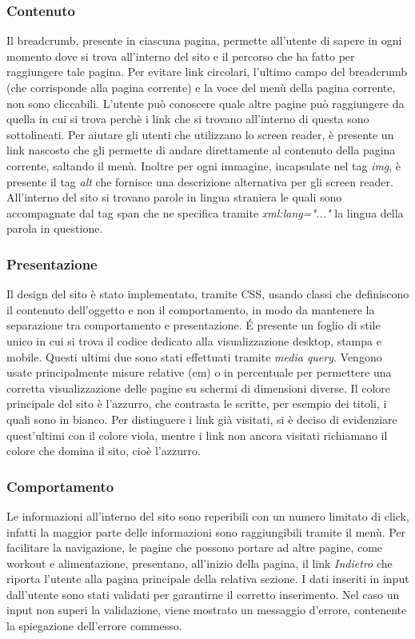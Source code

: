 \subsubsection{Contenuto}
Il breadcrumb, presente in ciascuna pagina, permette all'utente di sapere in ogni momento dove si trova all'interno del sito e il percorso che ha fatto per raggiungere tale pagina. Per evitare link circolari, l'ultimo campo del breadcrumb (che corrisponde alla pagina corrente) e la voce del menù della pagina corrente, non sono cliccabili. L'utente può conoscere quale altre pagine può raggiungere da quella in cui si trova perchè i link che si trovano all'interno di questa sono sottolineati. 
Per aiutare gli utenti che utilizzano lo screen reader, è presente un link nascosto che gli permette di andare direttamente al contenuto della pagina corrente, saltando il menù. Inoltre per ogni immagine, incapsulate nel tag \textit{img}, è presente il tag \textit{alt}  che fornisce una  descrizione alternativa per gli screen reader. 
All'interno del sito si trovano parole in lingua straniera le quali sono accompagnate dal tag span che ne specifica tramite \textit{xml:lang="..."} la lingua della parola in questione. 


\subsubsection{Presentazione}
Il design del sito è stato implementato, tramite CSS, usando classi che definiscono il contenuto
dell’oggetto e non il comportamento, in modo da mantenere la separazione tra comportamento e presentazione. É presente un foglio di stile unico in cui si trova il codice dedicato alla visualizzazione desktop, stampa e mobile. Questi ultimi due sono stati effettuati tramite \textit{media query}. Vengono usate principalmente misure relative (em) o in percentuale per permettere una corretta visualizzazione delle pagine su schermi di dimensioni diverse. 
Il colore principale del sito è l'azzurro, che contrasta le scritte, per esempio dei titoli, i quali sono in bianco. Per distinguere i link già visitati, si è deciso di evidenziare quest'ultimi con il colore viola, mentre i link non ancora visitati richiamano il colore che domina il sito, cioè l'azzurro. 


\subsubsection{Comportamento}
Le informazioni all'interno del sito sono reperibili con un numero
limitato di click, infatti la maggior parte delle informazioni sono raggiungibili tramite il menù. 
Per facilitare la navigazione, le pagine che possono portare ad altre pagine, come workout e alimentazione, presentano, all'inizio della pagina, il link \textit{Indietro} che riporta l'utente alla pagina principale della relativa sezione. 
I dati inseriti in input dall'utente sono stati validati per garantirne il corretto inserimento. Nel caso un input non superi la validazione, viene mostrato un messaggio d'errore, contenente la spiegazione dell’errore commesso.

